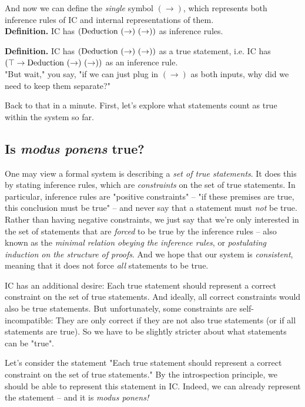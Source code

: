 \documentclass{article}
\begin{document}
  And now we can define the \emph{single} symbol $(\to)$, which represents both inference rules of IC and internal representations of them.
  \\
  
  \textbf{Definition.} IC has $(\operatorname{\mathrm{Deduction}}\ (\to)\ (\to))$ as inference rules.
  
  \textbf{Definition.} IC has $(\operatorname{\mathrm{Deduction}}\ (\to)\ (\to))$ as a true statement, i.e. IC has $(\top \to \deduction\ (\to)\ (\to))$ as an inference rule.
  \\
  
  "But wait," you say, "if we can just plug in $(\to)$ as both inputs, why did we need to keep them separate?"
  
  Back to that in a minute. First, let's explore what statements count as true within the system so far.
  
  \subsection{Is \emph{modus ponens} true?}
  
  One may view a formal system is describing a \emph{set of true statements}. It does this by stating inference rules, which are \emph{constraints} on the set of true statements. In particular, inference rules are "positive constraints" – "if these premises are true, this conclusion must be true" – and never say that a statement must \emph{not} be true. Rather than having negative constraints, we just say that we're only interested in the set of statements that are \emph{forced} to be true by the inference rules – also known as the \emph{minimal relation obeying the inference rules}, or \emph{postulating induction on the structure of proofs}. And we hope that our system is \emph{consistent}, meaning that it does not force \emph{all} statements to be true.
  
  IC has an additional desire: Each true statement should represent a correct constraint on the set of true statements. And ideally, all correct constraints would also be true statements. But unfortunately, some constraints are self-incompatible: They are only correct if they are not also true statements (or if all statements are true). So we have to be slightly stricter about what statements can be "true".
  
  Let's consider the statement "Each true statement should represent a correct constraint on the set of true statements." By the introspection principle, we should be able to represent this statement in IC. Indeed, we can already represent the statement – and it is \emph{modus ponens!}
  
\end{document}
